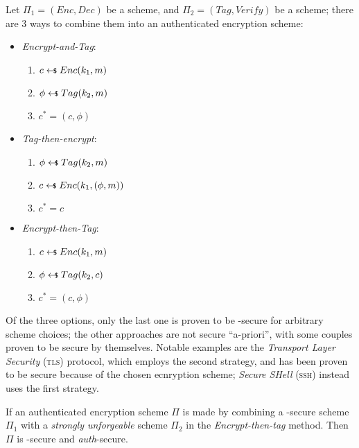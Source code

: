 Let $\Pi_1 = (Enc, Dec)$ be a \ske{} scheme, and $\Pi_2 = (\textit{Tag}, \textit{Verify})$ be a \mac{} scheme; there are 3 ways to combine them into an authenticated encryption scheme:
\begin{itemize}
    \item \emph{Encrypt-and-Tag}:
    \begin{enumerate}
        \item $c \pickUAR Enc(k_1, m)$
        \item $\phi \pickUAR Tag(k_2, m)$
        \item $c^* = (c, \phi)$
    \end{enumerate}
        
    \item \emph{Tag-then-encrypt}:
    \begin{enumerate}
        \item $\phi \pickUAR Tag(k_2, m)$
        \item $c \pickUAR Enc(k_1, (\phi, m))$
        \item $c^* = c$
    \end{enumerate}

    \item \emph{Encrypt-then-Tag}:
    \begin{enumerate}
        \item $c \pickUAR Enc(k_1, m)$
        \item $\phi \pickUAR Tag(k_2, c)$
        \item $c^* = (c, \phi)$
    \end{enumerate}
\end{itemize}

Of the three options, only the last one is proven to be \cca-secure for arbitrary scheme choices; the other approaches are not secure ``a-priori'', with some couples proven to be secure by themselves. Notable examples are the \emph{Transport Layer Security} (\textsc{tls}) protocol, which employs the second strategy, and has been proven to be secure because of the chosen ecnryption scheme; \emph{Secure SHell} (\textsc{ssh}) instead uses the first strategy.

\begin{theorem}
    If an authenticated encryption scheme $\Pi$ is made by combining a \cpa-secure \ske{} scheme $\Pi_1$ with a \emph{strongly unforgeable} \mac{} scheme $\Pi_{2}$ in the \emph{Encrypt-then-tag} method. Then $\Pi$ is \cpa-secure and \textit{auth}-secure. 
\end{theorem}

